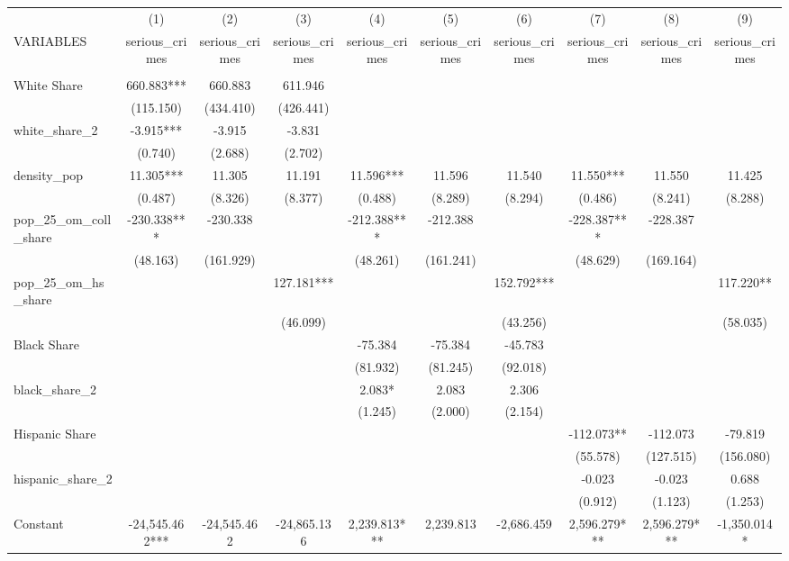 \documentclass[]{article}
\begin{document}
\begin{tabular}{lccccccccc} \hline
 & (1) & (2) & (3) & (4) & (5) & (6) & (7) & (8) & (9) \\
VARIABLES & serious\_crimes & serious\_crimes & serious\_crimes & serious\_crimes & serious\_crimes & serious\_crimes & serious\_crimes & serious\_crimes & serious\_crimes \\ \hline
 &  &  &  &  &  &  &  &  &  \\
White Share & 660.883*** & 660.883 & 611.946 &  &  &  &  &  &  \\
 & (115.150) & (434.410) & (426.441) &  &  &  &  &  &  \\
white\_share\_2 & -3.915*** & -3.915 & -3.831 &  &  &  &  &  &  \\
 & (0.740) & (2.688) & (2.702) &  &  &  &  &  &  \\
density\_pop & 11.305*** & 11.305 & 11.191 & 11.596*** & 11.596 & 11.540 & 11.550*** & 11.550 & 11.425 \\
 & (0.487) & (8.326) & (8.377) & (0.488) & (8.289) & (8.294) & (0.486) & (8.241) & (8.288) \\
pop\_25\_om\_coll\_share & -230.338*** & -230.338 &  & -212.388*** & -212.388 &  & -228.387*** & -228.387 &  \\
 & (48.163) & (161.929) &  & (48.261) & (161.241) &  & (48.629) & (169.164) &  \\
pop\_25\_om\_hs\_share &  &  & 127.181*** &  &  & 152.792*** &  &  & 117.220** \\
 &  &  & (46.099) &  &  & (43.256) &  &  & (58.035) \\
Black Share &  &  &  & -75.384 & -75.384 & -45.783 &  &  &  \\
 &  &  &  & (81.932) & (81.245) & (92.018) &  &  &  \\
black\_share\_2 &  &  &  & 2.083* & 2.083 & 2.306 &  &  &  \\
 &  &  &  & (1.245) & (2.000) & (2.154) &  &  &  \\
Hispanic Share &  &  &  &  &  &  & -112.073** & -112.073 & -79.819 \\
 &  &  &  &  &  &  & (55.578) & (127.515) & (156.080) \\
hispanic\_share\_2 &  &  &  &  &  &  & -0.023 & -0.023 & 0.688 \\
 &  &  &  &  &  &  & (0.912) & (1.123) & (1.253) \\
Constant & -24,545.462*** & -24,545.462 & -24,865.136 & 2,239.813*** & 2,239.813 & -2,686.459 & 2,596.279*** & 2,596.279*** & -1,350.014* \\

\end{tabular}
\end{document}
